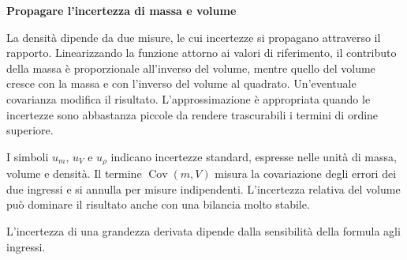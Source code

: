 \documentclass[12pt,aspectratio=1610]{beamer}
\begin{document}
\begin{lrbox}{\TitleBox}\begin{minipage}[t]{18.2cm}\raggedright\sloppy\color{Ink}\fontsize{20.7}{24}\selectfont \bfseries\color{Navy}Propagare l’incertezza di massa e volume\end{minipage}\end{lrbox}
\begin{lrbox}{\BodyBox}\begin{minipage}[t]{10.25cm}\raggedright\sloppy\color{Ink}\fontsize{12.4}{16.4}\selectfont La densità dipende da due misure, le cui incertezze si propagano attraverso il rapporto. Linearizzando la funzione attorno ai valori di riferimento, il contributo della massa è proporzionale all’inverso del volume, mentre quello del volume cresce con la massa e con l’inverso del volume al quadrato. Un’eventuale covarianza modifica il risultato. L’approssimazione è appropriata quando le incertezze sono abbastanza piccole da rendere trascurabili i termini di ordine superiore.\par{}\end{minipage}\end{lrbox}
\begin{lrbox}{\SideBox}\begin{minipage}[t]{7.45cm}\raggedright\sloppy\color{Ink}\fontsize{12.2}{16.1}\selectfont I simboli $u_m$, $u_V$ e $u_\rho$ indicano incertezze standard, espresse nelle unità di massa, volume e densità. Il termine $\operatorname{Cov}(m,V)$ misura la covariazione degli errori dei due ingressi e si annulla per misure indipendenti. L’incertezza relativa del volume può dominare il risultato anche con una bilancia molto stabile.\end{minipage}\end{lrbox}
\begin{lrbox}{\RecallBox}\begin{minipage}[t]{16.45cm}\raggedright\sloppy\color{Ink}\fontsize{10.1}{13.2}\selectfont L’incertezza di una grandezza derivata dipende dalla sensibilità della formula agli ingressi.\end{minipage}\end{lrbox}
\end{document}

